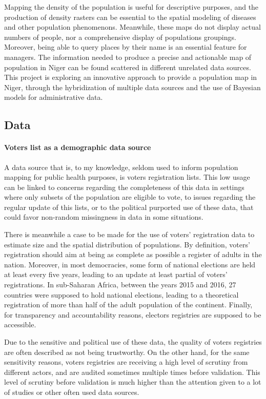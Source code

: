 Mapping the density of the population is useful for descriptive purposes, and the production of density rasters can be essential to the spatial modeling of diseases and other population phenomenons. Meanwhile, these maps do not display actual numbers of people, nor a comprehensive display of populations groupings. Moreover, being able to query places by their name is an essential feature for managers. The information needed to produce a precise and actionable map of population in Niger can be found scattered in different unrelated data sources. This  project is exploring an innovative approach to provide a population map in Niger, through the hybridization of multiple data sources and the use of Bayesian models for administrative data.

\subsection{Data}
\label{aim2:data}

\paragraph{Voters list as a demographic data source} A data source that is, to my knowledge, seldom used to inform population mapping for public health purposes, is voters registration lists. This low usage can be linked to concerns regarding the completeness of this data in settings where only subsets of the population are eligible to vote, to issues regarding the regular update of this lists, or to the political purported use of these data, that could favor non-random missingness in data in some situations.

There is meanwhile a case to be made for the use of voters' registration data to estimate size and the spatial distribution of populations. By definition, voters' registration should aim at being as complete as possible a register of adults in the nation. Moreover, in most democracies, some form of national elections are held at least  every five years, leading to an update at least partial of voters' registrations. In sub-Saharan Africa, between the years 2015 and 2016, 27 countries were supposed to hold national elections, leading to a theoretical registration of more than half of the adult population of the continent. Finally, for transparency and accountability reasons, electors registries are supposed to be accessible.

Due to the sensitive and political use of these data, the quality of voters registries are often described as not being trustworthy. On the other hand, for the same sensitivity reasons, voters registries are receiving a high level of scrutiny from different actors, and are audited sometimes multiple times before validation. This level of scrutiny before validation is much higher than the attention given to a lot of studies or other often used data sources.

